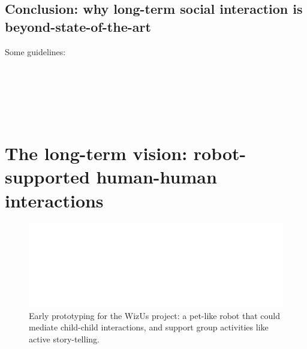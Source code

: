 \documentclass[11pt,a4paper]{report}
\newcommand{\project}{WizUs\xspace}
\begin{document}
\subsection{Conclusion: why long-term social interaction is beyond-state-of-the-art}



Some guidelines:

~\cite{tulli2019great}
~\cite{hoffman2019anki}

~\cite{tonkin2018design}


~\cite{baraka2019extended}










\section{The long-term vision: robot-supported human-human interactions}

\begin{figure}
    \centering
    \includegraphics[width=0.9\linewidth]{figs/wizme+dolls}
    \caption{Early prototyping for the \project project: a pet-like robot that could
    mediate child-child interactions, and support group activities like active story-telling.}
    \label{early-prototype}
\end{figure}



%
%
\end{document}

